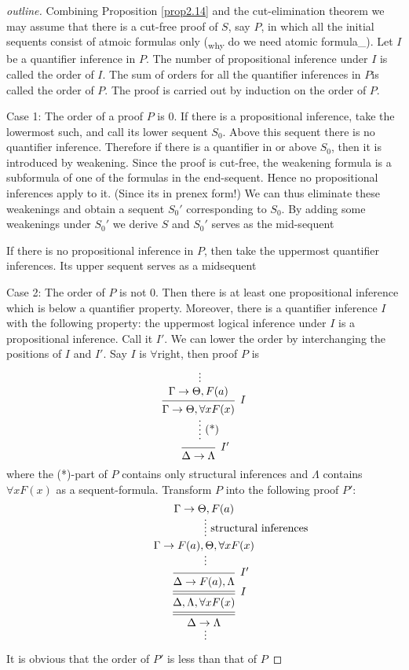 \documentclass[11pt]{article}
\begin{document}
\begin{proof}[outline]


Combining Proposition \ref{prop2.14} and the cut-elimination theorem we may assume that there is a
cut-free proof of \(S\), say \(P\), in which all the initial sequents consist of atmoic formulas
only (\textsubscript{why} do we need atomic formula\_). Let \(I\) be a quantifier inference in \(P\). The number of propositional inference
under \(I\) is called the order of \(I\). The sum of orders for all the quantifier inferences
in \(P\)is called the order of \(P\). The proof is carried out by induction on the order
of \(P\).

Case 1: The order of a proof \(P\) is 0. If there is a propositional inference, take the
lowermost such, and call its lower sequent \(S_0\). Above this sequent there is no quantifier
inference. Therefore if there is a quantifier in or above \(S_0\), then it is introduced by
weakening. Since the proof is cut-free, the weakening formula is a subformula of one of the
formulas in the end-sequent. Hence no propositional inferences apply to it. (Since its in prenex form!)
We can thus eliminate
these weakenings and obtain a sequent \(S_0'\) corresponding to \(S_0\). By adding some
weakenings under \(S_0'\) we derive \(S\) and \(S_0'\) serves as the mid-sequent

If there is no propositional inference in \(P\), then take the uppermost quantifier inferences.
Its upper sequent serves as a midsequent

Case 2: The order of \(P\) is not 0. Then there is at least one propositional inference which is
below a quantifier property. Moreover, there is a quantifier inference \(I\) with the following
property: the uppermost logical inference under \(I\) is a propositional inference. Call
it \(I'\). We can lower the order by interchanging the positions of \(I\) and \(I'\). Say \(I\)
is \(\forall\)right, then proof \(P\) is 
\begin{equation*}
\begin{prooftree}%
\hypo{}
\ellipsis{}{\Gamma\to\Theta,F(a)}
\infer1[\(I\)]{\Gamma\to\Theta,\forall xF(x)}
\ellipsis{(*)}{}
\infer1[\(I'\)]{\Delta\to\Lambda}
\end{prooftree}
\end{equation*}
where the (*)-part of \(P\) contains only structural inferences and \(\Lambda\) contains \(\forall xF(x)\) as a
sequent-formula. Transform \(P\) into the following proof \(P'\):
\begin{equation*}
\begin{prooftree}%
\hypo{\Gamma\to\Theta,F(a)}
\ellipsis{structural inferences}{\Gamma\to F(a),\Theta,\forall xF(x)}
\ellipsis{}{}
\infer1[\(I'\)]{\Delta\to F(a),\Lambda}
\infer[double]1[\(I\)]{\Delta,\Lambda,\forall xF(x)}
\infer[double]1{\Delta\to\Lambda}
\ellipsis{}{}
\end{prooftree}
\end{equation*}
It is obvious that the order of \(P'\) is less than that of \(P\)
\end{proof}
\end{document}
